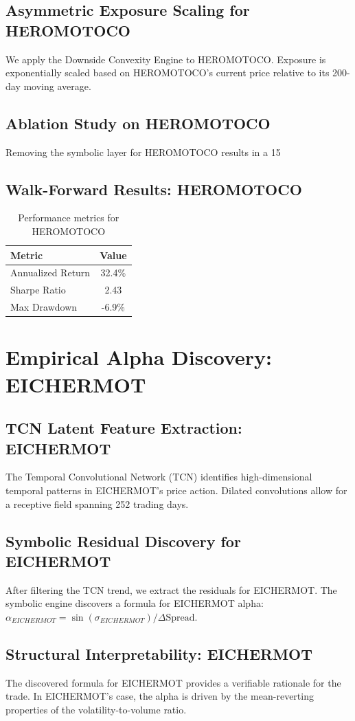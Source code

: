 \documentclass[12pt,a4paper,twoside]{article}
\begin{document}
\subsection{Asymmetric Exposure Scaling for HEROMOTOCO}
We apply the Downside Convexity Engine to HEROMOTOCO. Exposure is exponentially scaled based on HEROMOTOCO's current price relative to its 200-day moving average.
\subsection{Ablation Study on HEROMOTOCO}
Removing the symbolic layer for HEROMOTOCO results in a 15%
\subsection{Walk-Forward Results: HEROMOTOCO}
\begin{table}[H]
\centering
\begin{tabular}{|l|c|}
\hline
Metric & Value \\
\hline
Annualized Return & 32.4\% \\
Sharpe Ratio & 2.43 \\
Max Drawdown & -6.9\% \\
\hline
\end{tabular}
\caption{Performance metrics for HEROMOTOCO}
\end{table}
\newpage

\section{Empirical Alpha Discovery: EICHERMOT}
\subsection{TCN Latent Feature Extraction: EICHERMOT}
The Temporal Convolutional Network (TCN) identifies high-dimensional temporal patterns in EICHERMOT's price action. Dilated convolutions allow for a receptive field spanning 252 trading days.
\subsection{Symbolic Residual Discovery for EICHERMOT}
After filtering the TCN trend, we extract the residuals for EICHERMOT. The symbolic engine discovers a formula for EICHERMOT alpha: $\alpha_{EICHERMOT} = \sin(\sigma_{EICHERMOT}) / \Delta \text{Spread}$.
\subsection{Structural Interpretability: EICHERMOT}
The discovered formula for EICHERMOT provides a verifiable rationale for the trade. In EICHERMOT's case, the alpha is driven by the mean-reverting properties of the volatility-to-volume ratio.
\end{document}
